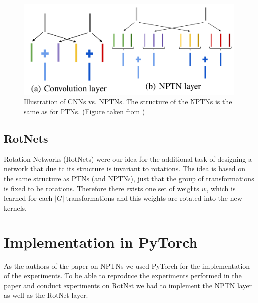 \documentclass{llncs}
\begin{document}
\begin{figure}
	\begin{center}
	\includegraphics[scale=0.15]{result_images/nptn_paper.png}
	\caption{Illustration of CNNs vs. NPTNs. The structure of the NPTNs is the same as for PTNs. (Figure taken from \cite{NPTN18})}
	\label{pic:nptn}
	\end{center}
\end{figure}


\subsection{RotNets}
Rotation Networks (RotNets) were our idea for the additional task of designing a network that due to its structure is invariant to rotations. 
The idea is based on the same structure as PTNs (and NPTNs), just that the group of transformations is fixed to be rotations. Therefore there exists one set of weights $w$, which is learned for each $|G|$ transformations and this weights are rotated into the new kernels. 
\newcommand{\pytorch}{PyTorch }
\section{Implementation in \pytorch}
\newcommand{\nnaffinegrid}{\nolinkurl{nn.functional.affine\textunderscore grid} }
\newcommand{\nngridsample}{\nolinkurl{nn.functional.grid\textunderscore sample} }
\newcommand{\nnConvFunction}{\nolinkurl{nn.functional.conv2d} }
\newcommand{\nnConvLayer}{\nolinkurl{nn.Conv2d} }
\newcommand{\nnMaxPool}{\nolinkurl{nn.MaxPool3d} }
\newcommand{\nnAvgPool}{\nolinkurl{nn.AvgPool3d} }
\newcommand{\nnTensor}{\nolinkurl{nn.Tensor} }
\newcommand{\nnParameter}{\nolinkurl{torch.nn.Parameter} }

As the authors of the paper on NPTNs \cite{NPTN18} we used \pytorch for the implementation of the experiments.
To be able to reproduce the experiments performed in the paper and conduct experiments on RotNet we had to implement the NPTN layer as well as the RotNet layer.
\end{document}
